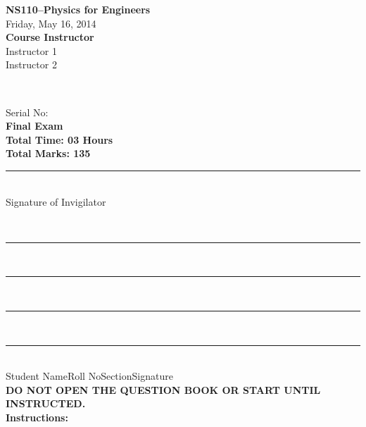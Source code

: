 \documentclass[12pt,a4paper]{article}
\newcommand\Exam{Final Exam}
\newcommand\Subject{NS110--Physics for Engineers}
\newcommand\ExamDate{Friday, May 16, 2014}
\newcommand\InstructorOne{Instructor 1}
\newcommand\InstructorTwo{Instructor 2}
\newcommand\InstructorThree{\null}
\newcommand\TotalTime{03 Hours}
\newcommand\TotalMarks{135}
\def\Qone{5}
\def\Qtwo{15}
\def\Qthree{10}
\def\Qfour{20}
\def\Qfive{10}
\def\Qsix{10}
\def\Qseven{10}
\def\Qeight{27}
\def\Qnine{11}
\def\Qten{17}
\def\SingleSpacing{\def\baselinestretch{1}\large\normalsize}
\def\DoubleSpacing{\def\baselinestretch{1.5}\large\normalsize}
\begin{document}
\begin{minipage}[t]{0.6\textwidth}
\begin{flushleft}
\DoubleSpacing
{\Large\textbf{\Subject}}\\
{\normalsize\ExamDate}\\
{\large\textbf{Course Instructor}}\\
{\normalsize\InstructorOne}\\
{\normalsize\InstructorTwo}\\
{\normalsize\InstructorThree}
\end{flushleft}
\end{minipage}
\begin{minipage}[t]{0.01\textwidth}
~
\end{minipage}
\begin{minipage}[t]{0.325\textwidth}
\DoubleSpacing
{\normalsize Serial No:}\\
{\Large\textbf{\Exam}}\\
{\large\textbf{Total Time: \TotalTime}}\\
{\large\textbf{Total Marks: \TotalMarks}}\\[1cm]
\rule{5cm}{0.2mm}\\[-0.25cm]
{\small Signature of Invigilator}
\end{minipage}
\SingleSpacing
~\\[1.5cm] %
\rule{7cm}{0.2mm}~\rule{2.5cm}{0.2mm}~\rule{2cm}{0.2mm}~\rule{4.5cm}{0.2mm}\\
{\small Student Name\hspace{4.75cm}Roll No\hspace{1.35cm}Section\hspace{0.95cm}Signature}\\[1cm]
\textbf{DO NOT OPEN THE QUESTION BOOK OR START UNTIL INSTRUCTED.}\\
\textbf{Instructions:}
\end{document}
